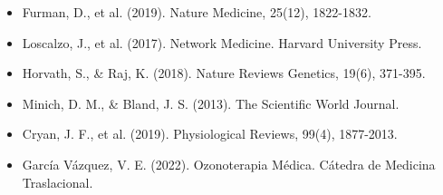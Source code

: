 \begin{itemize}
    \item Furman, D., et al. (2019). Nature Medicine, 25(12), 1822-1832.
    \item Loscalzo, J., et al. (2017). Network Medicine. Harvard University Press.
    \item Horvath, S., & Raj, K. (2018). Nature Reviews Genetics, 19(6), 371-395.
    \item Minich, D. M., & Bland, J. S. (2013). The Scientific World Journal.
    \item Cryan, J. F., et al. (2019). Physiological Reviews, 99(4), 1877-2013.
    \item García Vázquez, V. E. (2022). Ozonoterapia Médica. Cátedra de Medicina Traslacional.
\end{itemize}